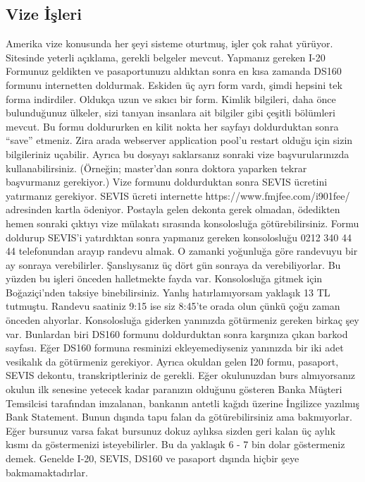 \documentclass[12pt]{article}
\theoremstyle{break}
\begin{document}
\subsection{Vize İşleri}
Amerika vize konusunda her şeyi sisteme oturtmuş, işler çok rahat yürüyor. Sitesinde yeterli açıklama, gerekli belgeler mevcut. Yapmanız gereken I-20 Formunuz geldikten ve pasaportunuzu aldıktan sonra en kısa zamanda DS160 formunu internetten doldurmak. Eskiden üç ayrı form vardı, şimdi hepsini tek forma indirdiler. Oldukça uzun ve sıkıcı bir form. Kimlik bilgileri, daha önce bulunduğunuz ülkeler, sizi tanıyan insanlara ait bilgiler gibi çeşitli bölümleri mevcut. Bu formu doldururken en kilit nokta her sayfayı doldurduktan sonra “save” etmeniz. Zira arada webserver application pool’u restart olduğu için sizin bilgileriniz uçabilir. Ayrıca bu dosyayı saklarsanız sonraki vize başvurularınızda kullanabilirsiniz. (Örneğin; master’dan sonra doktora yaparken tekrar başvurmanız gerekiyor.) Vize formunu doldurduktan sonra SEVIS ücretini yatırmanız gerekiyor. SEVIS ücreti internette https://www.fmjfee.com/i901fee/ adresinden kartla ödeniyor. Postayla gelen dekonta gerek olmadan, ödedikten hemen sonraki çıktıyı vize mülakatı sırasında konsolosluğa götürebilirsiniz. Formu doldurup SEVIS’i yatırdıktan sonra yapmanız gereken konsolosluğu 0212 340 44 44 telefonundan arayıp randevu almak. O zamanki yoğunluğa göre randevuyu bir ay sonraya verebilirler. Şanslıysanız üç dört gün sonraya da verebiliyorlar. Bu yüzden bu işleri önceden halletmekte fayda var. Konsolosluğa gitmek için Boğaziçi’nden taksiye binebilirsiniz. Yanlış hatırlamıyorsam yaklaşık 13 TL tutmuştu. Randevu saatiniz 9:15 ise siz 8:45’te orada olun çünkü çoğu zaman önceden alıyorlar. Konsolosluğa giderken yanınızda götürmeniz gereken birkaç şey var. Bunlardan biri DS160 formunu doldurduktan sonra karşınıza çıkan barkod sayfası. Eğer DS160 formuna resminizi ekleyemediyseniz yanınızda bir iki adet vesikalık da götürmeniz gerekiyor. Ayrıca okuldan gelen I20 formu, pasaport, SEVIS dekontu, transkriptleriniz de gerekli. Eğer okulunuzdan burs almıyorsanız okulun ilk senesine yetecek kadar paranızın olduğunu gösteren Banka Müşteri Temsilcisi tarafından imzalanan, bankanın antetli kağıdı üzerine İngilizce yazılmış Bank Statement. Bunun dışında tapu falan da götürebilirsiniz ama bakmıyorlar. Eğer bursunuz varsa fakat bursunuz dokuz aylıksa sizden geri kalan üç aylık kısmı da göstermenizi isteyebilirler. Bu da yaklaşık 6 - 7 bin dolar göstermeniz demek. Genelde I-20, SEVIS, DS160 ve pasaport dışında hiçbir şeye bakmamaktadırlar.
%
%
%
\end{document}

